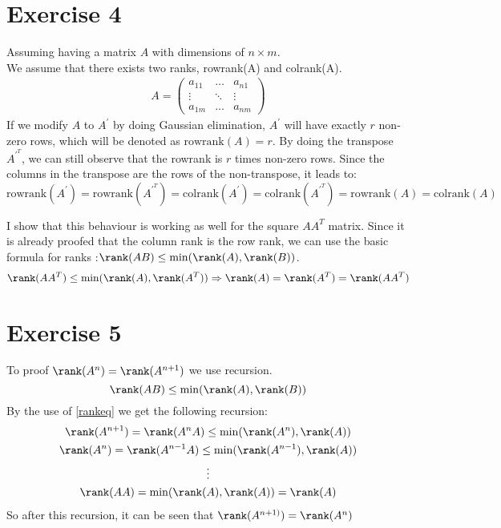 \section{Exercise 4}
Assuming having a matrix $A$ with dimensions of $n\times m$.\\
We assume that there exists two ranks, rowrank(A) and colrank(A).
\begin{gather*}
A = \left( \begin{array}{ccc}
a_{11} & \hdots & a_{n1} \\
\vdots & \ddots & \vdots \\
a_{1m} & \hdots & a_{nm}
\end{array} \right)
\end{gather*}
If we modify $A$ to $A^{'}$ by doing Gaussian elimination, $A^{'}$ will have exactly $r$ non-zero rows, which will be denoted as $\text{rowrank}(A) = r$. 
By doing the transpose $A^{{'}^T}$, we can still observe that the rowrank is $r$ times non-zero rows. Since the columns in the transpose are the rows of the non-transpose, it leads to:
\begin{equation*}
\text{rowrank}(A^{'}) = \text{rowrank}(A^{{'}^T}) = \text{colrank}(A^{'}) = \text{colrank}(A^{{'}^T}) = \text{rowrank}(A) = \text{colrank} (A)
\end{equation*}

I show that this behaviour is working as well for the square $AA^T$ matrix. Since it is already proofed that the column rank is the row rank, we can use the basic formula for ranks :$\rank(AB) \leq \min(\rank (A), \rank(B))$.
\begin{equation}
\rank(A A^T) \leq \min( \rank (A) , \rank (A^T)) \Rightarrow \rank (A)=\rank (A^T)= \rank (A A^T)
\end{equation}

\section{Exercise 5}
To proof $\rank (A^n) = \rank (A^{n+1})$  we use recursion. 
\begin{equation}
\label{rankeq}
\rank (AB) \leq \min (\rank (A), \rank (B))
\end{equation}
By the use of \ref{rankeq} we get the following recursion:
\begin{gather*}
\rank (A^{n+1}) =  
\rank (A^{n} A) \leq \min ( \rank (A^n), \rank(A) ) \\
\rank (A^n) = \rank (A^{n-1} A) \leq \min ( \rank (A^{n-1}), \rank(A) ) \\
\vdots \\
\rank(A A) = \min ( \rank (A), \rank(A) ) = \rank(A)
\end{gather*}
So after this recursion, it can be seen that $\rank (A^{n+1)}) = \rank (A^{n})$

